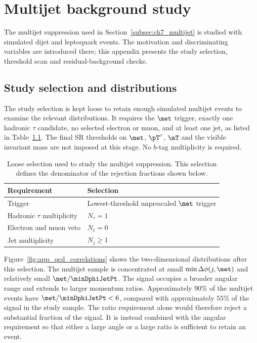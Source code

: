 \chapter{Multijet background study}
\label{App:QCD_bkg_study}

The multijet suppression used in Section~\ref{subsec:ch7_multijet} is studied with simulated dijet and leptoquark events.
The motivation and discriminating variables are introduced there; this appendix presents the study selection, threshold scan and residual-background checks.

\section{Study selection and distributions}
\label{sec:app_qcd_selection}

The study selection is kept loose to retain enough simulated multijet events to examine the relevant distributions.
It requires the $\met$ trigger, exactly one hadronic $\tau$ candidate, no selected electron or muon, and at least one jet, as listed in Table~\ref{tab:app_qcd_preselection}.
The final SR thresholds on $\met$, $\pT^\tau$, $\mT$ and the visible invariant mass are not imposed at this stage.
No $b$-tag multiplicity is required.

\begin{table}[htbp]
    \centering
    \caption{Loose selection used to study the multijet suppression. This selection defines the denominator of the rejection fractions shown below.}
    \label{tab:app_qcd_preselection}
    \begin{tabular}{ll}
        \toprule
        Requirement & Selection \\
        \midrule
        Trigger & Lowest-threshold unprescaled $\met$ trigger \\
        Hadronic $\tau$ multiplicity & $N_\tau=1$ \\
        Electron and muon veto & $N_\ell=0$ \\
        Jet multiplicity & $N_j\geq1$ \\
        \bottomrule
    \end{tabular}
\end{table}

Figure~\ref{fig:app_qcd_correlations} shows the two-dimensional distributions after this selection.
The multijet sample is concentrated at small $\min\Delta\phi(j,\met)$ and relatively small $\met/\minDphiJetPt$.
The signal occupies a broader angular range and extends to larger momentum ratios.
Approximately $90\%$ of the multijet events have $\met/\minDphiJetPt<6$, compared with approximately $55\%$ of the signal in the study sample.
The ratio requirement alone would therefore reject a substantial fraction of the signal.
It is instead combined with the angular requirement so that either a large angle or a large ratio is sufficient to retain an event.

